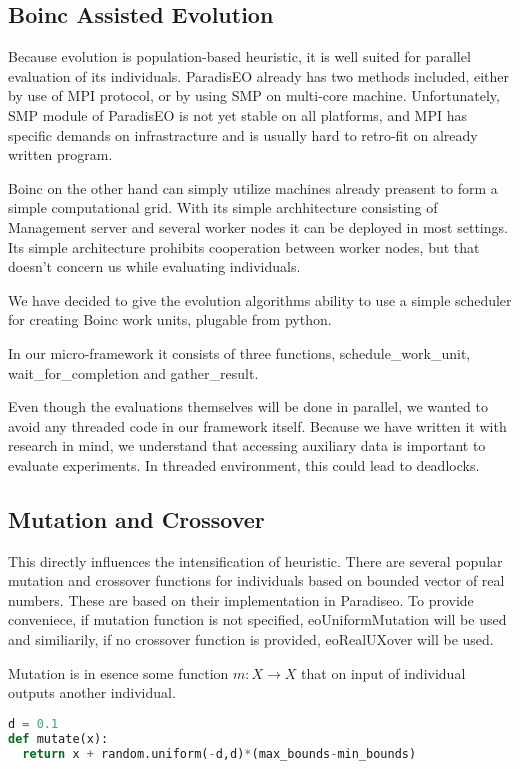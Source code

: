 \documentclass[12pt,oneside]{fithesis2}
\begin{document}
\subsection{Boinc Assisted Evolution}

Because evolution is population-based heuristic, it is well suited for parallel evaluation of its individuals. ParadisEO already has two methods included, either by use of MPI protocol, or by using SMP on multi-core machine\cite{liefooghe2007paradiseo}. Unfortunately, SMP module of ParadisEO is not yet stable on all platforms, and MPI has specific demands on infrastracture and is usually hard to retro-fit on already written program. 

Boinc on the other hand  can simply utilize machines already preasent to form a simple computational grid. With its simple archhitecture consisting of Management server and several worker nodes it can be deployed in most settings. Its simple architecture prohibits cooperation between worker nodes, but that doesn't concern us while evaluating individuals.

We have decided to give the evolution algorithms ability to use a simple scheduler for creating Boinc work units, plugable from python.

In our micro-framework it consists of three functions, schedule\_work\_unit, wait\_for\_completion and gather\_result.

Even though the evaluations themselves will be done in parallel, we wanted to avoid any threaded code in our framework itself. Because we have written it with research in mind, we understand that accessing auxiliary data is important to evaluate experiments. In threaded environment, this could lead to deadlocks.

\subsection{Mutation and Crossover}
This directly influences the intensification of heuristic. There are several popular mutation and crossover functions for individuals based on bounded vector of real numbers. These are based on their implementation in Paradiseo. To provide conveniece, if mutation function is not specified, eoUniformMutation will be used and similiarily, if no crossover function is provided, eoRealUXover will be used. 

Mutation is in esence some function $m:X \to X$ that on input of individual outputs another individual.
\begin{lstlisting}[language=Python,label=mutate_example,caption=Mutation example]
d = 0.1
def mutate(x):
  return x + random.uniform(-d,d)*(max_bounds-min_bounds)
\end{lstlisting}
\end{document}
